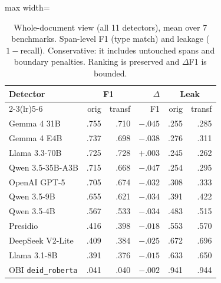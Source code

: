 \documentclass[pmlr,twocolumn,10pt]{jmlr}
\newcommand{\tp}[1]{\texttt{#1}}
\begin{document}
\begin{table}[htbp]\centering\small
\begin{adjustbox}{max width=\columnwidth}%
\begin{tabular}{lrrrrr}
\toprule
Detector & \multicolumn{2}{c}{F1} & $\Delta$ & \multicolumn{2}{c}{Leak}\\
\cmidrule(lr){2-3}\cmidrule(lr){5-6}
 & orig & transf & F1 & orig & transf\\
\midrule
Gemma 4 31B & .755 & .710 & $-.045$ & .255 & .285\\
Gemma 4 E4B & .737 & .698 & $-.038$ & .276 & .311\\
Llama 3.3-70B & .725 & .728 & $+.003$ & .245 & .262\\
Qwen 3.5-35B-A3B & .715 & .668 & $-.047$ & .254 & .295\\
OpenAI GPT-5 & .705 & .674 & $-.032$ & .308 & .333\\
Qwen 3.5-9B & .655 & .621 & $-.034$ & .391 & .422\\
Qwen 3.5-4B & .567 & .533 & $-.034$ & .483 & .515\\
Presidio & .416 & .398 & $-.018$ & .553 & .570\\
DeepSeek V2-Lite & .409 & .384 & $-.025$ & .672 & .696\\
Llama 3.1-8B & .391 & .376 & $-.015$ & .633 & .650\\
OBI \tp{deid\_roberta} & .041 & .040 & $-.002$ & .941 & .944\\
\bottomrule
\end{tabular}
\end{adjustbox}
\caption{Whole-document view (all 11 detectors), mean over 7 benchmarks. Span-level F1 (type match) and leakage ($1-$recall). Conservative: it includes untouched spans and boundary penalties. Ranking is preserved and $\Delta$F1 is bounded.}\label{tab:fullf1}
\end{table}
\end{document}
